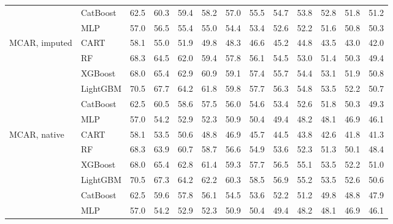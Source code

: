 \documentclass[pdflatex,sn-mathphys]{sn-jnl}
\theoremstyle{thmstyleone}
\begin{document}
\begin{table}[htbp]
\begin{tabular}{@{}llrrrrrrrrrrr@{}}
 & CatBoost & 62.5 & 60.3 & 59.4 & 58.2 & 57.0 & 55.5 & 54.7 & 53.8 & 52.8 & 51.8 & 51.2 \\
 & MLP & 57.0 & 56.5 & 55.4 & 55.0 & 54.4 & 53.4 & 52.6 & 52.2 & 51.6 & 50.8 & 50.3 \\
\midrule
MCAR, imputed & CART & 58.1 & 55.0 & 51.9 & 49.8 & 48.3 & 46.6 & 45.2 & 44.8 & 43.5 & 43.0 & 42.0 \\
 & RF & 68.3 & 64.5 & 62.0 & 59.4 & 57.8 & 56.1 & 54.5 & 53.0 & 51.4 & 50.3 & 49.4 \\
 & XGBoost & 68.0 & 65.4 & 62.9 & 60.9 & 59.1 & 57.4 & 55.7 & 54.4 & 53.1 & 51.9 & 50.8 \\
 & LightGBM & 70.5 & 67.7 & 64.2 & 61.8 & 59.8 & 57.7 & 56.3 & 54.8 & 53.5 & 52.2 & 50.7 \\
 & CatBoost & 62.5 & 60.5 & 58.6 & 57.5 & 56.0 & 54.6 & 53.4 & 52.6 & 51.8 & 50.3 & 49.3 \\
 & MLP & 57.0 & 54.2 & 52.9 & 52.3 & 50.9 & 50.4 & 49.4 & 48.2 & 48.1 & 46.9 & 46.1 \\
\midrule
MCAR, native & CART & 58.1 & 53.5 & 50.6 & 48.8 & 46.9 & 45.7 & 44.5 & 43.8 & 42.6 & 41.8 & 41.3 \\
 & RF & 68.3 & 63.9 & 60.7 & 58.7 & 56.6 & 54.9 & 53.6 & 52.3 & 51.3 & 50.1 & 48.4 \\
 & XGBoost & 68.0 & 65.4 & 62.8 & 61.4 & 59.3 & 57.7 & 56.5 & 55.1 & 53.5 & 52.2 & 51.0 \\
 & LightGBM & 70.5 & 67.3 & 64.2 & 62.2 & 60.3 & 58.5 & 56.9 & 55.2 & 53.5 & 52.6 & 50.6 \\
 & CatBoost & 62.5 & 59.6 & 57.8 & 56.1 & 54.5 & 53.6 & 52.2 & 51.2 & 49.8 & 48.8 & 47.9 \\
 & MLP & 57.0 & 54.2 & 52.9 & 52.3 & 50.9 & 50.4 & 49.4 & 48.2 & 48.1 & 46.9 & 46.1 \\
\bottomrule
\end{tabular}
\end{table}
\end{document}

